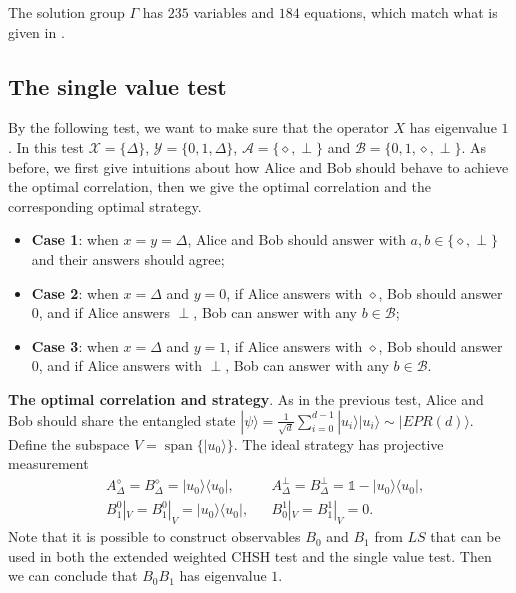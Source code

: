 \documentclass[11pt,letterpaper]{article}
\newcommand{\ket}[1]{|#1\rangle}
\newcommand{\ketbra}[2]{|#1\rangle\langle#2|}
\DeclareMathOperator{\spn}{span}
\newcommand{\calX}{\mathcal{X}}
\newcommand{\calY}{\mathcal{Y}}
\newcommand{\calA}{\mathcal{A}}
\newcommand{\calB}{\mathcal{B}}
\newcommand{\tri}{\Delta}
\newcommand{\1}{\mathbb{1}}
\theoremstyle{definition}
\begin{document}
The solution group $\Gamma$ has $235$ variables and $184$ equations, which match what is given in
\cite{slofstra2017}.

\subsection{The single value test}
By the following test, we want to make sure that the operator $X$ has eigenvalue $1$.
In this test $\calX = \{\tri \}$, $\calY = \{0,1,\tri\}$, $\calA = \{\diamond, \perp\}$ and $\calB = \{0,1, \diamond, \perp\}$.
As before, we first give intuitions about how Alice and Bob should behave to achieve the optimal correlation, then
we give the optimal correlation and the corresponding optimal strategy.
\begin{itemize}
	\item \textbf{Case 1}: when $x = y = \tri$, Alice and Bob should answer with $a, b \in \{\diamond, \perp\}$ and 
	their answers should agree;
	\item \textbf{Case 2}: when $x =\tri$ and $y = 0$, if Alice answers with $\diamond$, Bob should answer $0$, and if 
	Alice answers $\perp$, Bob can answer with any $b \in \calB$;
	\item \textbf{Case 3}: when $x = \tri$ and $y = 1$, if Alice answers with $\diamond$, Bob should answer $0$, and if  
	Alice answers with $\perp$, Bob can answer with any $b \in \calB$.
\end{itemize}

\textbf{The optimal correlation and strategy}.
As in the previous test, Alice and Bob should share the entangled state
$\ket{\psi} = \frac{1}{\sqrt{d}}\sum_{i=0}^{d-1} \ket{u_i}\ket{u_i} \sim \ket{EPR(d)}$.
Define the subspace $V = \spn\{ \ket{u_0} \}$.
The ideal strategy has projective measurement 
\begin{align*}
&A_\tri^\diamond = B_\tri^\diamond= \ketbra{u_0}{u_0}, 
&&A_\tri^\perp = B_\tri^\perp = \1 - \ketbra{u_0}{u_0},\\
&B_1^0|_V = B_1^0|_V = \ketbra{u_0}{u_0}, 
&&B_0^1|_V = B_1^1|_V = 0.
\end{align*}
Note that it is possible to construct observables $B_0$ and $B_1$ from $LS$
that can be used in both the extended weighted CHSH test and the single value test.
Then we can conclude that $B_0B_1$ has eigenvalue $1$.
\end{document}
